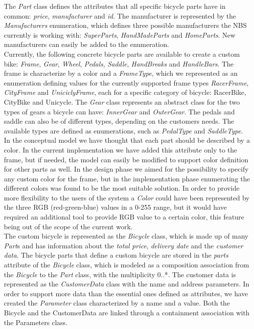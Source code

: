 \noindent The \emph{Part} class defines the attributes that all specific bicycle
parts have in common: \emph{price}, \emph{manufacturer} and \emph{id}. The
manufacturer is represented by the \emph{Manufacturers} enumeration, which
defines three possible manufacturers the NBS currently is working with:
\emph{SuperParts}, \emph{HandMadeParts} and \emph{HomeParts}. New manufacturers
can easily be added to the enumeration.\\

\noindent Currently, the following concrete bicycle parts are available to
create a custom bike: \emph{Frame}, \emph{Gear}, \emph{Wheel}, \emph{Pedals}, \emph{Saddle},
\emph{HandBreaks} and \emph{HandleBars}. The frame is characterize by
a color and a \emph{FrameType}, which we represented as an enumeration defining
values for the currently supported frame types \emph{RacerFrame}, \emph{CityFrame} and
\emph{UniciclyFrame}, each for a specific category of bicycle: RacerBike,
CityBike and Unicycle. The \emph{Gear} class represents an abstract class for
the two types of gears a bicycle can have: \emph{InnerGear} and
\emph{OuterGear}. The pedals and saddle can also be of different types,
depending on the customers needs. The available types are defined as
enumerations, such as \emph{PedalType} and \emph{SaddleType}. \\

\noindent In the conceptual model we have thought that each part should be
described by a color. In the current implementation we have added this attribute only to the frame, but if
needed, the model can easily be modified to support color definition for other parts as well.
In the design phase we aimed for the possibility to specify any custom color for
the frame, but in the implementation phase enumerating the different colors was
found to be the most suitable solution. In order to provide more flexibility to
the users of the system a \emph{Color} could have been represented by the three
RGB (red-green-blue) values in a 0-255 range, but it would have required an
additional tool to provide RGB value to a certain color, this feature being out
of the scope of the current work.\\

\noindent The custom bicycle is represented as the \emph{Bicycle} class, which
is made up of many \emph{Part}s and has information about the \emph{total
price}, \emph{delivery date} and the \emph{customer data}. The bicycle parts
that define a custom bicycle are stored in the \emph{parts} attribute of
the \emph{Bicycle} class, which is modeled as a composition association from the
\emph{Bicycle} to the \emph{Part} class, with the multiplicity 0..*. The customer data is represented as the \emph{CustomerData}
class with the name and address parameters. In order to support more data than
the essential ones defined as attributes, we have created the \emph{Parameter}
class characterized by a name and a value. Both the Bicycle and the CustomerData
are linked through a containment association with the Parameters class.\\


